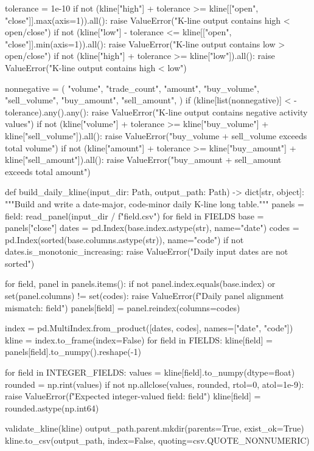 \documentclass[UTF8,a4paper,fontset=fandol]{ctexart}
\begin{document}
\begin{ProjectCode}
    tolerance = 1e-10
    if not (kline["high"] + tolerance >= kline[["open", "close"]].max(axis=1)).all():
        raise ValueError("K-line output contains high < open/close")
    if not (kline["low"] - tolerance <= kline[["open", "close"]].min(axis=1)).all():
        raise ValueError("K-line output contains low > open/close")
    if not (kline["high"] + tolerance >= kline["low"]).all():
        raise ValueError("K-line output contains high < low")

    nonnegative = (
        "volume",
        "trade_count",
        "amount",
        "buy_volume",
        "sell_volume",
        "buy_amount",
        "sell_amount",
    )
    if (kline[list(nonnegative)] < -tolerance).any().any():
        raise ValueError("K-line output contains negative activity values")
    if not (kline["volume"] + tolerance >= kline["buy_volume"] + kline["sell_volume"]).all():
        raise ValueError("buy_volume + sell_volume exceeds total volume")
    if not (kline["amount"] + tolerance >= kline["buy_amount"] + kline["sell_amount"]).all():
        raise ValueError("buy_amount + sell_amount exceeds total amount")


def build_daily_kline(input_dir: Path, output_path: Path) -> dict[str, object]:
    """Build and write a date-major, code-minor daily K-line long table."""
    panels = {field: read_panel(input_dir / f"{field}.csv") for field in FIELDS}
    base = panels["close"]
    dates = pd.Index(base.index.astype(str), name="date")
    codes = pd.Index(sorted(base.columns.astype(str)), name="code")
    if not dates.is_monotonic_increasing:
        raise ValueError("Daily input dates are not sorted")

    for field, panel in panels.items():
        if not panel.index.equals(base.index) or set(panel.columns) != set(codes):
            raise ValueError(f"Daily panel alignment mismatch: {field}")
        panels[field] = panel.reindex(columns=codes)

    index = pd.MultiIndex.from_product([dates, codes], names=["date", "code"])
    kline = index.to_frame(index=False)
    for field in FIELDS:
        kline[field] = panels[field].to_numpy().reshape(-1)

    for field in INTEGER_FIELDS:
        values = kline[field].to_numpy(dtype=float)
        rounded = np.rint(values)
        if not np.allclose(values, rounded, rtol=0, atol=1e-9):
            raise ValueError(f"Expected integer-valued field: {field}")
        kline[field] = rounded.astype(np.int64)

    validate_kline(kline)
    output_path.parent.mkdir(parents=True, exist_ok=True)
    kline.to_csv(output_path, index=False, quoting=csv.QUOTE_NONNUMERIC)


\end{ProjectCode}
\end{document}
